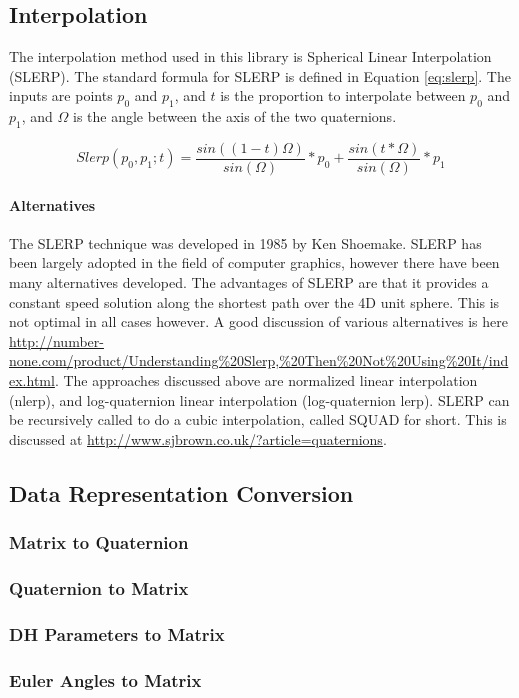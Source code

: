 \documentclass[12pt]{article}
\newcommand{\todo}[1]{\vspace{3 mm}\par \noindent {\textsc{ToDo}}\framebox{
\begin{minipage}[c]{1.0\hsize}\tt #1 \end{minipage}}\vspace{3mm}\par}
\begin{document}
\subsection{Interpolation}
The interpolation method used in this library is Spherical Linear Interpolation
(SLERP).  The standard formula for SLERP is defined in Equation \ref{eq:slerp}.
The inputs are points $p_0$ and $p_1$, and $t$ is the proportion to interpolate 
between $p_0$ and $p_1$, and $\Omega$ is the angle between the axis of the two quaternions. 

\begin{equation}
Slerp(p_0,p_1;t) = \frac{sin((1-t)\Omega)}{sin(\Omega)} * p_0 + \frac{sin(t*\Omega)}{sin(\Omega)} * p_1
\label{eq:slerp}
\end{equation}

\todo{add graphic}

\paragraph{Alternatives}
The SLERP technique was developed in 1985 by Ken Shoemake. \cite{SHOEMAKE} SLERP has been 
largely adopted in the field of computer graphics, however there have been many alternatives 
developed.  The advantages of SLERP are that it provides a constant speed solution 
along the shortest path over the 4D unit sphere.  This is not optimal in all cases however.
A good discussion of various alternatives is here \url{http://number-none.com/product/Understanding%20Slerp,%20Then%20Not%20Using%20It/index.html}. 
The approaches discussed above are normalized linear interpolation (nlerp), and 
log-quaternion linear interpolation (log-quaternion lerp). 
SLERP can be recursively called to do a cubic interpolation, called SQUAD for short.  
This is discussed at \url{http://www.sjbrown.co.uk/?article=quaternions}.


\subsection{Data Representation Conversion}
\subsubsection{Matrix to Quaternion}
\subsubsection{Quaternion to Matrix}
\subsubsection{DH Parameters to Matrix}
\subsubsection{Euler Angles to Matrix}





\printindex
\end{document}
